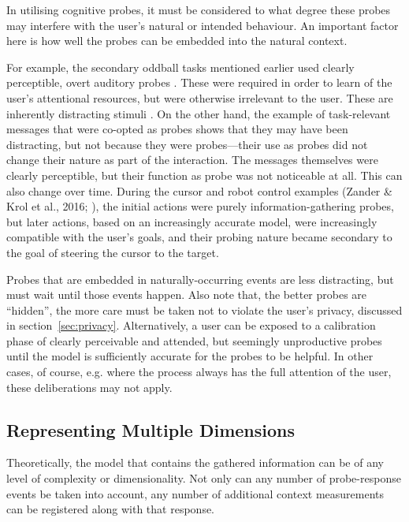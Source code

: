 In utilising cognitive probes, it must be considered to what degree these probes may interfere with the user's natural or intended behaviour. An important factor here is how well the probes can be embedded into the natural context.

For example, the secondary oddball tasks mentioned earlier used clearly perceptible, overt auditory probes \cite{schultheis2004textdifficulty,kohlmorgen2007}. These were required in order to learn of the user's attentional resources, but were otherwise irrelevant to the user. These are inherently distracting stimuli \cite{parmentier2011distraction}. On the other hand, the example of task-relevant messages that were co-opted as probes \cite{kirchner2016multirobotcontrol} shows that they may have been distracting, but not because they were probes---their use as probes did not change their nature as part of the interaction. The messages themselves were clearly perceptible, but their function as probe was not noticeable at all. This can also change over time. During the cursor and robot control examples (Zander \& Krol et al., 2016; ), the initial actions were purely information-gathering probes, but later actions, based on an increasingly accurate model, were increasingly compatible with the user's goals, and their probing nature became secondary to the goal of steering the cursor to the target. 

Probes that are embedded in naturally-occurring events are less distracting, but must wait until those events happen. Also note that, the better probes are ``hidden'', the more care must be taken not to violate the user's privacy, discussed in section~\ref{sec:privacy}. Alternatively, a user can be exposed to a calibration phase of clearly perceivable and attended, but seemingly unproductive probes until the model is sufficiently accurate for the probes to be helpful. In other cases, of course, e.g. where the process always has the full attention of the user, these deliberations may not apply.


\subsection{Representing Multiple Dimensions}
\label{sec:dimensionality}

Theoretically, the model that contains the gathered information can be of any level of complexity or dimensionality. Not only can any number of probe-response events be taken into account, any number of additional context measurements can be registered along with that response.

